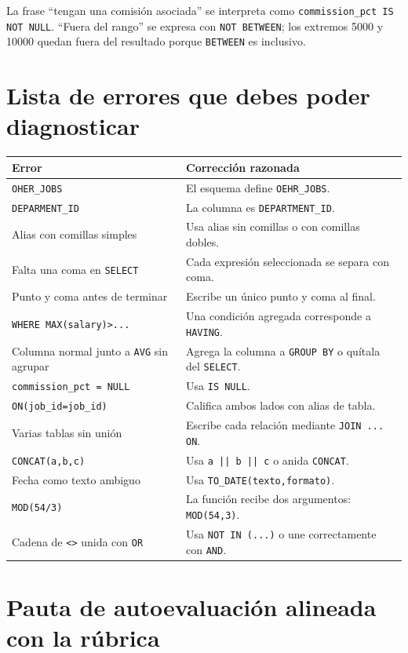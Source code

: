 \documentclass[11pt,a4paper]{article}
\newcommand{\campo}[1]{\texttt{#1}}
\begin{document}
La frase ``tengan una comisión asociada'' se interpreta como
\campo{commission\_pct IS NOT NULL}. ``Fuera del rango'' se expresa con
\campo{NOT BETWEEN}; los extremos 5000 y 10000 quedan fuera del resultado porque
\campo{BETWEEN} es inclusivo.
\fi

\section{Lista de errores que debes poder diagnosticar}

\begin{longtable}{p{} p{}}
\toprule
\textbf{Error} & \textbf{Corrección razonada} \\
\midrule
\endhead
\campo{OHER\_JOBS} & El esquema define \campo{OEHR\_JOBS}. \\
\campo{DEPARMENT\_ID} & La columna es \campo{DEPARTMENT\_ID}. \\
Alias con comillas simples & Usa alias sin comillas o con comillas dobles. \\
Falta una coma en \campo{SELECT} & Cada expresión seleccionada se separa con coma. \\
Punto y coma antes de terminar & Escribe un único punto y coma al final. \\
\campo{WHERE MAX(salary)>...} & Una condición agregada corresponde a \campo{HAVING}. \\
Columna normal junto a \campo{AVG} sin agrupar & Agrega la columna a \campo{GROUP BY} o quítala del
\campo{SELECT}. \\
\campo{commission\_pct = NULL} & Usa \campo{IS NULL}. \\
\campo{ON(job\_id=job\_id)} & Califica ambos lados con alias de tabla. \\
Varias tablas sin unión & Escribe cada relación mediante \campo{JOIN ... ON}. \\
\campo{CONCAT(a,b,c)} & Usa \campo{a || b || c} o anida \campo{CONCAT}. \\
Fecha como texto ambiguo & Usa \campo{TO\_DATE(texto,formato)}. \\
\campo{MOD(54/3)} & La función recibe dos argumentos: \campo{MOD(54,3)}. \\
Cadena de \campo{<>} unida con \campo{OR} & Usa \campo{NOT IN (...)} o une correctamente con
\campo{AND}. \\
\bottomrule
\end{longtable}

\section{Pauta de autoevaluación alineada con la rúbrica}
\end{document}
